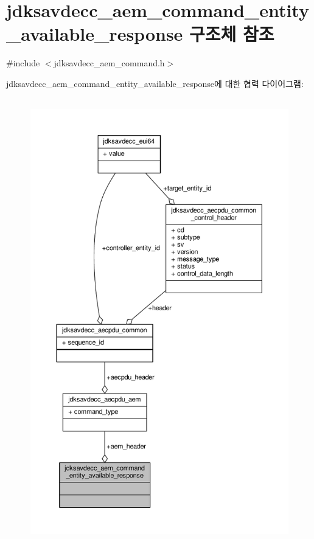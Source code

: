 \hypertarget{structjdksavdecc__aem__command__entity__available__response}{}\section{jdksavdecc\+\_\+aem\+\_\+command\+\_\+entity\+\_\+available\+\_\+response 구조체 참조}
\label{structjdksavdecc__aem__command__entity__available__response}


{\ttfamily \#include $<$jdksavdecc\+\_\+aem\+\_\+command.\+h$>$}



jdksavdecc\+\_\+aem\+\_\+command\+\_\+entity\+\_\+available\+\_\+response에 대한 협력 다이어그램\+:
\nopagebreak
\begin{figure}[H]
\begin{center}
\leavevmode
\includegraphics[height=550pt]{structjdksavdecc__aem__command__entity__available__response__coll__graph}
\end{center}
\end{figure}
